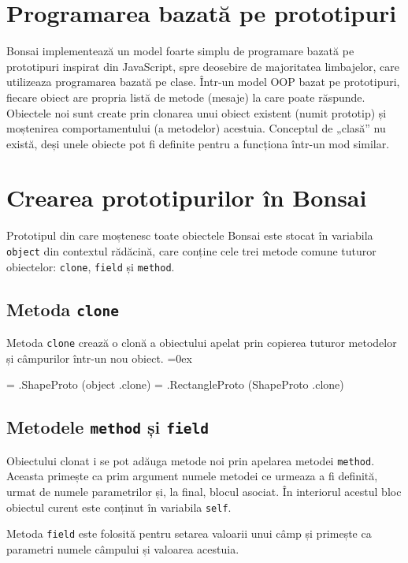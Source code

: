 \documentclass[12pt,a4paper]{memoir}
\renewcommand{\c}{\texttt}
\newenvironment{code}
{
\definecolor{shadecolor}{gray}{0.91}
\topsep=0ex
\relax
\shaded
\verbatim
}
{
\endverbatim
\endshaded
}
\begin{document}
\section{Programarea bazată pe prototipuri}

Bonsai implementează un model foarte simplu de programare bazată pe prototipuri\cite{prototype_based_programming} inspirat din JavaScript, spre deosebire de majoritatea limbajelor, care utilizeaza programarea bazată pe clase. Într-un model OOP bazat pe prototipuri, fiecare obiect are propria listă de metode (mesaje) la care poate răspunde. Obiectele noi sunt create prin clonarea unui obiect existent (numit prototip) și moștenirea comportamentului (a metodelor) acestuia. Conceptul de „clasă” nu există, deși unele obiecte pot fi definite pentru a funcționa într-un mod similar. 

\section{Crearea prototipurilor în Bonsai}

Prototipul din care moștenesc toate obiectele Bonsai este stocat în variabila \c{object} din contextul rădăcină, care conține cele trei metode comune tuturor obiectelor: \c{clone}, \c{field} și \c{method}.

\subsection{Metoda \c{clone}}

Metoda \c{clone} crează o clonă a obiectului apelat prin copierea tuturor metodelor și câmpurilor într-un nou obiect. 
\begin{code}
= .ShapeProto (object .clone)
= .RectangleProto (ShapeProto .clone)
\end{code}

\subsection{Metodele \c{method} și \c{field}}

Obiectului clonat i se pot adăuga metode noi prin apelarea metodei \c{method}. Aceasta primește ca prim argument numele metodei ce urmeaza a fi definită, urmat de numele parametrilor și, la final, blocul asociat. În interiorul acestul bloc obiectul curent este conținut în variabila \c{self}.

Metoda \c{field} este folosită pentru setarea valoarii unui câmp și primește ca parametri numele câmpului și valoarea acestuia.
\end{document}
